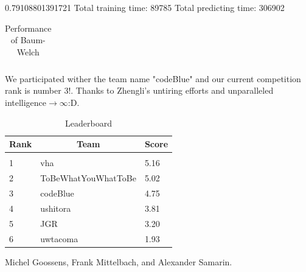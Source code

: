 \documentclass[letterpaper]{article}
\begin{document}
0.79108801391721
Total training time: 89785
Total predicting time: 306902


\begin{table}[h]
\caption{Performance of Baum-Welch}
\label{sample-table}
\begin{center}
\begin{tabular}{llll}\end{tabular}
\end{center}
\end{table}




We participated wither the team name "codeBlue" and our current competition rank is number 3!. \cite{hr}Thanks to Zhengli's untiring efforts and unparalleled intelligence$\longrightarrow\infty$:D. 

\begin{table}[h]
\caption{Leaderboard}
\label{sample-table}
\begin{center}
\begin{tabular}{lll}
\multicolumn{1}{c}{\bf Rank}  &\multicolumn{1}{c}{\bf Team} &\multicolumn{1}{c}{\bf Score}\\
\hline \\
1	&vha						&5.16\\
2	&ToBeWhatYouWhatToBe		&5.02\\
3	&codeBlue					&4.75\\
4	&ushitora					&3.81\\
5	&JGR						&3.20\\
6	&uwtacoma					&1.93\\
\end{tabular}
\end{center}
\end{table}

\newpage



\begin{thebibliography}{9}

Michel Goossens, Frank Mittelbach, and Alexander Samarin. 


\end{thebibliography}
\end{document}

